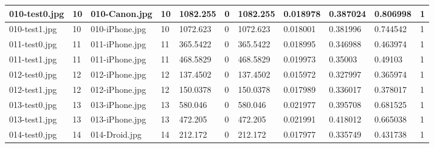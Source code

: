 \begin{landscape}
\begin{longtable}{|p{2cm}|p{1cm}|p{2cm}|p{1cm}|p{2cm}|p{1cm}|p{2cm}|p{2cm}|p{2cm}|p{2cm}|p{1cm}|}
	010-test0.jpg   & 10               & 010-Canon.jpg         & 10                          & 1082.255              & 0                       & 1082.255                   & 0.018978              & 0.387024              & 0.806998                 & 1                \\ \hline
	010-test1.jpg   & 10               & 010-iPhone.jpg        & 10                          & 1072.623              & 0                       & 1072.623                   & 0.018001              & 0.381996              & 0.744542                 & 1                \\ \hline
	011-test0.jpg   & 11               & 011-iPhone.jpg        & 11                          & 365.5422              & 0                       & 365.5422                   & 0.018995              & 0.346988              & 0.463974                 & 1                \\ \hline
	011-test1.jpg   & 11               & 011-iPhone.jpg        & 11                          & 468.5829              & 0                       & 468.5829                   & 0.019973              & 0.35003               & 0.49103                  & 1                \\ \hline
	012-test0.jpg   & 12               & 012-iPhone.jpg        & 12                          & 137.4502              & 0                       & 137.4502                   & 0.015972              & 0.327997              & 0.365974                 & 1                \\ \hline
	012-test1.jpg   & 12               & 012-iPhone.jpg        & 12                          & 150.0378              & 0                       & 150.0378                   & 0.017989              & 0.336017              & 0.378017                 & 1                \\ \hline
	013-test0.jpg   & 13               & 013-iPhone.jpg        & 13                          & 580.046               & 0                       & 580.046                    & 0.021977              & 0.395708              & 0.681525                 & 1                \\ \hline
	013-test1.jpg   & 13               & 013-iPhone.jpg        & 13                          & 472.205               & 0                       & 472.205                    & 0.021991              & 0.418012              & 0.665038                 & 1                \\ \hline
	014-test0.jpg   & 14               & 014-Droid.jpg         & 14                          & 212.172               & 0                       & 212.172                    & 0.017977              & 0.335749              & 0.431738                 & 1                \\ \hline

\end{longtable}
\end{landscape}
